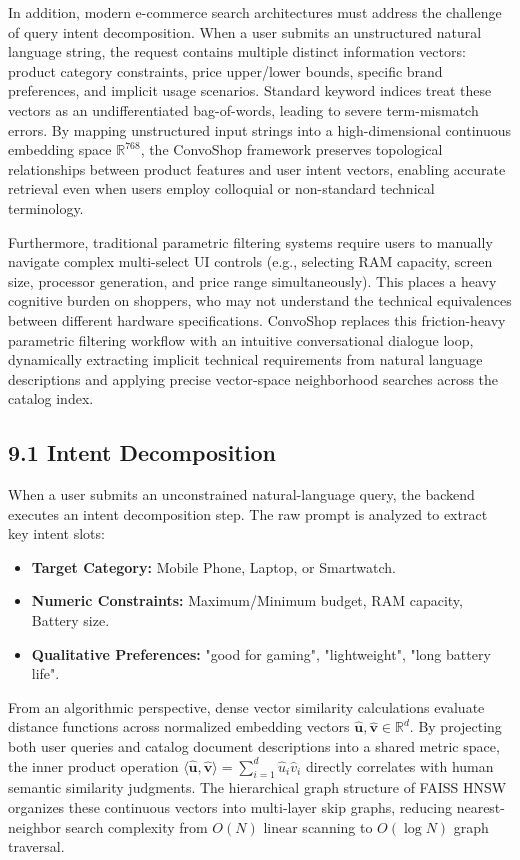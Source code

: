 \documentclass[12pt,a4paper]{article}
\begin{document}
In addition, modern e-commerce search architectures must address the challenge of query intent decomposition. When a user submits an unstructured natural language string, the request contains multiple distinct information vectors: product category constraints, price upper/lower bounds, specific brand preferences, and implicit usage scenarios. Standard keyword indices treat these vectors as an undifferentiated bag-of-words, leading to severe term-mismatch errors. By mapping unstructured input strings into a high-dimensional continuous embedding space $\mathbb{R}^{768}$, the ConvoShop framework preserves topological relationships between product features and user intent vectors, enabling accurate retrieval even when users employ colloquial or non-standard technical terminology.

Furthermore, traditional parametric filtering systems require users to manually navigate complex multi-select UI controls (e.g., selecting RAM capacity, screen size, processor generation, and price range simultaneously). This places a heavy cognitive burden on shoppers, who may not understand the technical equivalences between different hardware specifications. ConvoShop replaces this friction-heavy parametric filtering workflow with an intuitive conversational dialogue loop, dynamically extracting implicit technical requirements from natural language descriptions and applying precise vector-space neighborhood searches across the catalog index.

\subsection*{9.1 Intent Decomposition}
\label{sec:9.1}
When a user submits an unconstrained natural-language query, the backend executes an intent decomposition step. The raw prompt is analyzed to extract key intent slots:
\begin{itemize}
    \item \textbf{Target Category:} Mobile Phone, Laptop, or Smartwatch.
    \item \textbf{Numeric Constraints:} Maximum/Minimum budget, RAM capacity, Battery size.
    \item \textbf{Qualitative Preferences:} "good for gaming", "lightweight", "long battery life".
\end{itemize}



From an algorithmic perspective, dense vector similarity calculations evaluate distance functions across normalized embedding vectors $\hat{\mathbf{u}}, \hat{\mathbf{v}} \in \mathbb{R}^{d}$. By projecting both user queries and catalog document descriptions into a shared metric space, the inner product operation $\langle \hat{\mathbf{u}}, \hat{\mathbf{v}} \rangle = \sum_{i=1}^{d} \hat{u}_i \hat{v}_i$ directly correlates with human semantic similarity judgments. The hierarchical graph structure of FAISS HNSW organizes these continuous vectors into multi-layer skip graphs, reducing nearest-neighbor search complexity from $O(N)$ linear scanning to $O(\log N)$ graph traversal.
\end{document}
